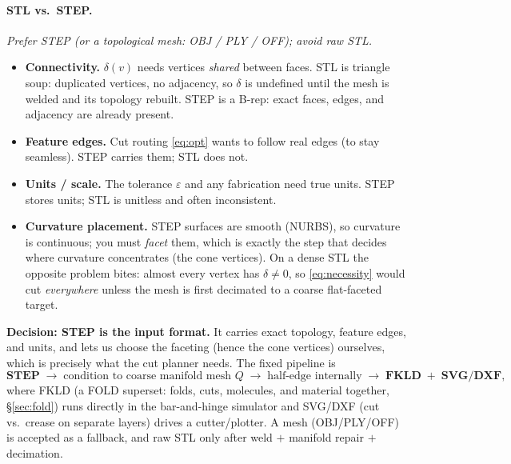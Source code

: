 \documentclass[11pt]{article}
\newcommand{\eps}{\varepsilon}
\newcommand{\defect}{\delta}
\begin{document}
\paragraph{STL vs.\ STEP.} \emph{Prefer STEP (or a topological mesh: OBJ /
PLY / OFF); avoid raw STL.}
\begin{itemize}[leftmargin=1.4em,itemsep=2pt]
  \item \textbf{Connectivity.} $\defect(v)$ needs vertices \emph{shared}
  between faces. STL is triangle soup: duplicated vertices, no adjacency, so
  $\defect$ is undefined until the mesh is welded and its topology rebuilt.
  STEP is a B-rep: exact faces, edges, and adjacency are already present.
  \item \textbf{Feature edges.} Cut routing \eqref{eq:opt} wants to follow
  real edges (to stay seamless). STEP carries them; STL does not.
  \item \textbf{Units / scale.} The tolerance $\eps$ and any fabrication need
  true units. STEP stores units; STL is unitless and often inconsistent.
  \item \textbf{Curvature placement.} STEP surfaces are smooth (NURBS), so
  curvature is continuous; you must \emph{facet} them, which is exactly the
  step that decides where curvature concentrates (the cone vertices). On a
  dense STL the opposite problem bites: almost every vertex has
  $\defect\neq0$, so \eqref{eq:necessity} would cut \emph{everywhere} unless
  the mesh is first decimated to a coarse flat-faceted target.
\end{itemize}
\textbf{Decision: STEP is the input format.} It carries exact topology,
feature edges, and units, and lets us choose the faceting (hence the cone
vertices) ourselves, which is precisely what the cut planner needs. The
fixed pipeline is
\[
\textbf{STEP} \;\rightarrow\; \text{condition to coarse manifold mesh } Q
\;\rightarrow\; \text{half-edge internally}
\;\rightarrow\; \textbf{FKLD} \;+\; \textbf{SVG/DXF},
\]
where FKLD (a FOLD superset: folds, cuts, molecules, and material together,
\S\ref{sec:fold}) runs directly in the bar-and-hinge simulator and SVG/DXF
(cut vs.\ crease on separate layers) drives a cutter/plotter. A mesh (OBJ/PLY/OFF) is accepted as a fallback, and
raw STL only after weld $+$ manifold repair $+$ decimation.
\end{document}
